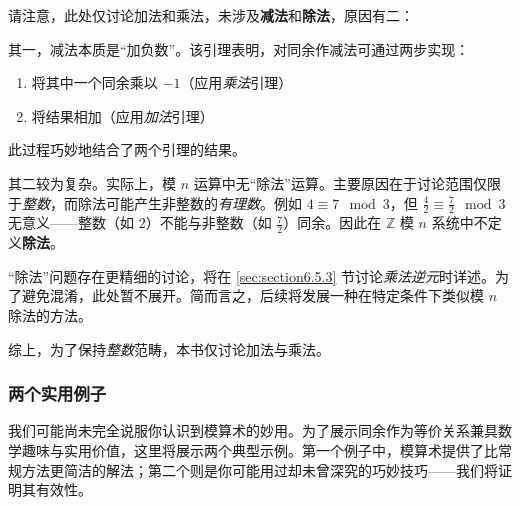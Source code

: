 \begin{remark}
    请注意，此处仅讨论加法和乘法，未涉及\textbf{减法}和\textbf{除法}，原因有二：

    其一，减法本质是``加负数''。该引理表明，对同余作减法可通过两步实现：
    \begin{enumerate}[label=(\arabic*)]
        \item 将其中一个同余乘以 $-1$（应用\emph{乘法}引理）
        \item 将结果相加（应用\emph{加法}引理）
    \end{enumerate}
    此过程巧妙地结合了两个引理的结果。

    其二较为复杂。实际上，模 $n$ 运算中无``除法''运算。主要原因在于讨论范围仅限于\emph{整数}，而除法可能产生非整数的\emph{有理数}。例如 $4 \equiv 7 \mod 3$，但 $\frac{4}{2} \equiv \frac{7}{2} \mod 3$ 无意义——整数（如 $2$）不能与非整数（如 $\frac{7}{2}$）同余。因此在 $\mathbb{Z}$ 模 $n$ 系统中不定义\textbf{除法}。

    ``除法''问题存在更精细的讨论，将在 \ref{sec:section6.5.3} 节讨论\emph{乘法逆元}时详述。为了避免混淆，此处暂不展开。简而言之，后续将发展一种在特定条件下类似模 $n$ 除法的方法。

    综上，为了保持\emph{整数}范畴，本书仅讨论加法与乘法。
\end{remark}

\subsubsection*{两个实用例子}

我们可能尚未完全说服你认识到模算术的妙用。为了展示同余作为等价关系兼具数学趣味与实用价值，这里将展示两个典型示例。第一个例子中，模算术提供了比常规方法更简洁的解法；第二个则是你可能用过却未曾深究的巧妙技巧——我们将证明其有效性。


